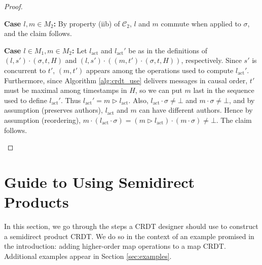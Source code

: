 \documentclass[acmsmall,nonacm,12pt]{acmart}
\newcommand{\mc}[1]{\ensuremath{\mathcal{#1}}}
\newcommand{\act}{\triangleright}
\theoremstyle{plain}
\theoremstyle{definition}
\begin{document}
\begin{proof}
\begin{enumerate}[(i)]
\textbf{Case $l, m \in M_2$:} By property (iib) of $\mc{C}_2$, $l$ and $m$ commute when applied to $\sigma$, and the claim follows.
    
\textbf{Case $l \in M_1, m \in M_2$:} Let $l_{\text{act}}$ and $l_{\text{act}}'$ be as in the definitions of $(l, s') \cdot (\sigma, t, H)$ and $(l, s') \cdot ((m, t') \cdot (\sigma, t, H))$, respectively.  Since $s'$ is concurrent to $t'$, $(m, t')$ appears among the operations used to compute $l_{\text{act}}'$. Furthermore, since Algorithm \ref{alg:crdt_use} delivers messages in causal order, $t'$ must be maximal among timestamps in $H$, so we can put $m$ last in the sequence used to define $l_{\text{act}}'$.  Thus $l_{\text{act}}' = m \act l_{\text{act}}$.  Also, $l_{\text{act}} \cdot \sigma \neq \bot$ and $m \cdot \sigma \neq \bot$, and by assumption (preserves authors), $l_{\text{act}}$ and $m$ can have different authors.  Hence by assumption (reordering), $m \cdot (l_{\text{act}} \cdot \sigma) = (m \act l_{\text{act}}) \cdot (m \cdot \sigma) \neq \bot$.  The claim follows.
\end{enumerate}
\end{proof}




\section{Guide to Using Semidirect Products}
\label{sec:tutorial}
In this section, we go through the steps a CRDT designer should use to construct a semidirect product CRDT.  We do so in the context of an example promised in the introduction: adding higher-order map operations to a map CRDT.  Additional examples appear in Section \ref{sec:examples}.
\end{document}

